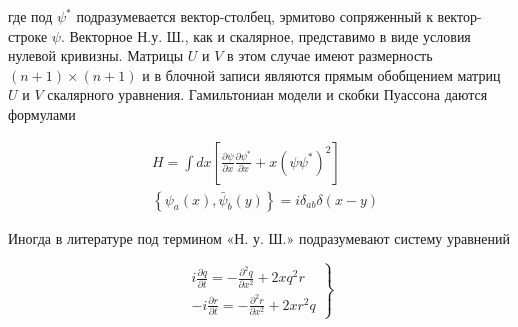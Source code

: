 \documentclass[10pt]{article}
\begin{document}
где под $\psi^{*}$ подразумевается вектор-столбец, эрмитово сопряженный к вектор-строке $\psi$. Векторное Н.у. Ш., как и скалярное, представимо в виде условия нулевой кривизны. Матрицы $U$ и $V$ в этом случае имеют размерность $(n+1) \times(n+1)$ и в блочной записи являются прямым обобщением матриц $U$ и $V$ скалярного уравнения. Гамильтониан модели и скобки Пуассона даются формулами



\[

\begin{aligned}

& H=\int d x\left[\frac{\partial \psi}{\partial x} \frac{\partial \psi^{*}}{\partial x}+x\left(\psi \psi^{*}\right)^{2}\right] \\

& \left\{\psi_{a}(x), \bar{\psi}_{b}(y)\right\}=i \delta_{a b} \delta(x-y)

\end{aligned}

\]



Иногда в литературе под термином «Н. у. Ш.» подразумевают систему уравнений



\[

\left.\begin{array}{l}

i \frac{\partial q}{\partial t}=-\frac{\partial^{2} q}{\partial x^{2}}+2 x q^{2} r \\

-i \frac{\partial r}{\partial t}=-\frac{\partial^{2} r}{\partial x^{2}}+2 x r^{2} q

\end{array}\right\}

\]
\end{document}
